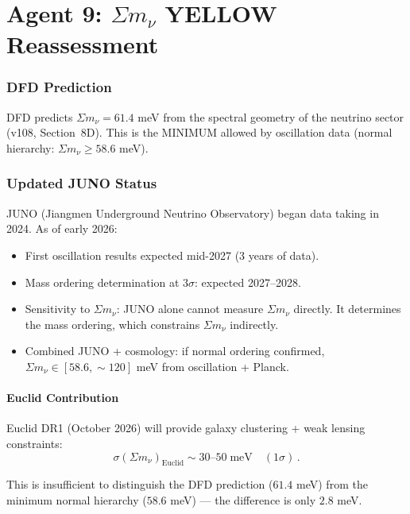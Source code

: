 \documentclass[11pt,a4paper]{article}
\begin{document}
\part{Agent 9: $\Sigma m_\nu$ YELLOW Reassessment}
\label{part:neutrino}

\section{DFD Prediction}

DFD predicts $\Sigma m_\nu = 61.4$ meV from the spectral geometry of the neutrino sector (v108, Section~8D). This is the MINIMUM allowed by oscillation data (normal hierarchy: $\Sigma m_\nu \geq 58.6$ meV).

\section{Updated JUNO Status}

JUNO (Jiangmen Underground Neutrino Observatory) began data taking in 2024. As of early 2026:

\begin{itemize}
\item First oscillation results expected mid-2027 (3 years of data).
\item Mass ordering determination at $3\sigma$: expected 2027--2028.
\item Sensitivity to $\Sigma m_\nu$: JUNO alone cannot measure $\Sigma m_\nu$ directly. It determines the mass ordering, which constrains $\Sigma m_\nu$ indirectly.
\item Combined JUNO + cosmology: if normal ordering confirmed, $\Sigma m_\nu \in [58.6, \sim 120]$ meV from oscillation + Planck.
\end{itemize}

\subsection{Euclid Contribution}

Euclid DR1 (October 2026) will provide galaxy clustering + weak lensing constraints:
\begin{equation}
\sigma(\Sigma m_\nu)_{\mathrm{Euclid}} \sim 30\text{--}50\;\mathrm{meV}\quad(1\sigma)\,.
\end{equation}

This is insufficient to distinguish the DFD prediction ($61.4$ meV) from the minimum normal hierarchy ($58.6$ meV) --- the difference is only $2.8$ meV.
\end{document}
